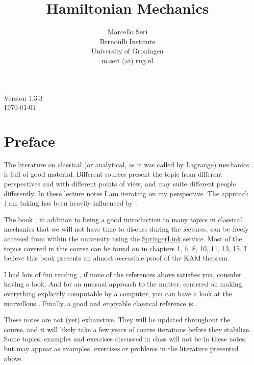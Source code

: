 \documentclass[english,fontsize=11pt,paper=a5,oneside]{scrbook}
\title{Hamiltonian Mechanics}
\author{Marcello Seri\\
\small{Bernoulli Institute}\vspace{-.2cm}\\
\small{University of Groningen}\vspace{-.2cm}\\
\small\href{mailto:m.seri@rug.nl}{m.seri (at) rug.nl}
}
\date{}
\theoremstyle{definition}
\def\biblio{}
\begin{document}
\def\biblio{}

\maketitle

\cleardoublepage

\thispagestyle{empty}
\null\vfill
\begin{center}
    Version 1.3.3\\
    \today
\end{center}
\vfill
\small{\doclicenseThis}

\cleardoublepage

\tableofcontents

\cleardoublepage

\chapter*{Preface}

The literature on classical (or analytical, as it was called by Lagrange) mechanics is full of good material.
Different sources present the topic from different perspectives and with different points of view, and may suite different people differently.
In these lecture notes I am iterating on my perspective.
The approach I am taking has been heavily influenced by \cite{book:arnold, book:knauf,lectures:dubrovin, book:lowenstein, book:marsdenratiu, lectures:tong,landau1976mechanics}.

The book \cite{book:knauf}, in addition to being a good introduction to many topics in classical mechanics that we will not have time to discuss during the lectures, can be freely accessed from within the university using the \href{https://link.springer.com/book/10.1007%2F978-3-662-55774-7}{SpringerLink} service.
Most of the topics covered in this course can be found on \cite{book:knauf} in chapters 1, 6, 8, 10, 11, 13, 15. I believe this book presents an almost accessible proof of the KAM theorem.

I had lots of fun reading \cite{schwichtenberg2019no}, if none of the references above satisfies you, consider having a look. And for an unusual approach to the matter, centered on making everything explicitly computable by a computer, you can have a look at the marvellous \cite{book:sicm}. Finally, a good and enjoyable classical reference is \cite{goldstein2013classical}.

These notes are not (yet) exhaustive.
They will be updated throughout the course, and it will likely take a few years of course iterations before they stabilize.
Some topics, examples and exercises discussed in class will not be in these notes, but may appear as examples, exercises or problems in the literature presented above.
\end{document}
